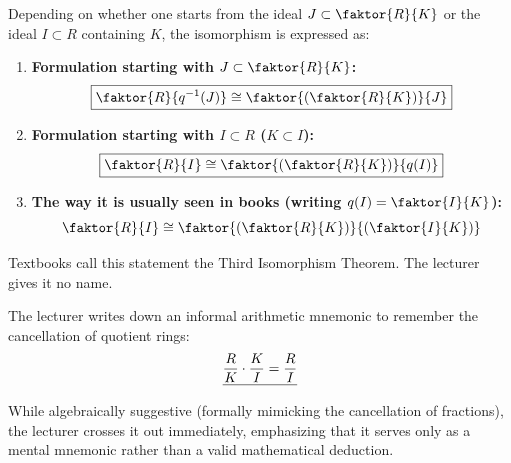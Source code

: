 \begin{content}

\begin{steps}
Depending on whether one starts from the ideal $J \subset \faktor{R}{K}$ or the ideal $I \subset R$ containing $K$, the isomorphism is expressed as:
\begin{enumerate}[label=\textbf{(\arabic*)}]
    \setcounter{enumi}{0} \item \textbf{Formulation starting with $J \subset \faktor{R}{K}$:}
    \[
    \boxed{\faktor{R}{q^{-1}(J)} \cong \faktor{\left(\faktor{R}{K}\right)}{J}}
    \]
    \setcounter{enumi}{1} \item \textbf{Formulation starting with $I \subset R$ ($K \subset I$):}
    \[
    \boxed{\faktor{R}{I} \cong \faktor{\left(\faktor{R}{K}\right)}{q(I)}}
    \]
    \setcounter{enumi}{2} \item \textbf{The way it is usually seen in books (writing $q(I) = \faktor{I}{K}$):}
    \[
    \faktor{R}{I} \cong \faktor{\left(\faktor{R}{K}\right)}{\left(\faktor{I}{K}\right)}
    \]
\end{enumerate}
\end{steps}
\end{content}

\begin{aiNote}
Textbooks call this statement the Third Isomorphism Theorem. The lecturer gives it no name.
\end{aiNote}

\begin{overview}
The lecturer writes down an informal arithmetic mnemonic to remember the cancellation of quotient rings:
\[
\sout{\frac{R}{K} \cdot \frac{K}{I} = \frac{R}{I}}
\]
While algebraically suggestive (formally mimicking the cancellation of fractions), the lecturer crosses it out immediately, emphasizing that it serves only as a mental mnemonic rather than a valid mathematical deduction.
\end{overview}

